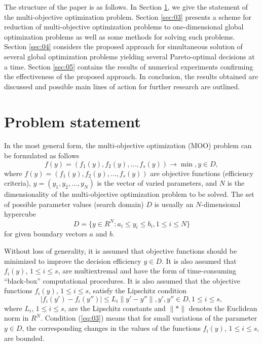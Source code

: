 \documentclass[runningheads]{llncs}
\begin{document}
The structure of the paper is as follows. In Section \ref{sec:02}, we give the statement of the multi-objective optimization problem. Section \ref{sec:03} presents a scheme for reduction of multi-objective optimization problems to one-dimensional global optimization problems as well as some methods for solving such problems. Section \ref{sec:04} considers the proposed approach for simultaneous solution of several global optimization problems yielding several Pareto-optimal decisions at a time. Section \ref{sec:05} contains the results of numerical experiments confirming the effectiveness of the proposed approach. In conclusion, the results obtained are discussed and possible main lines of action for further research are outlined.


\section{Problem statement} \label{sec:02}

In the most general form, the multi-objective optimization (MOO) problem can be formulated as follows
\begin{equation}
\label{eq:01}
f(y) = (f_1(y), f_2(y), \dots, f_s(y)) \to \min,  y\in D,
\end{equation}
where $f(y) = (f_1(y), f_2(y), \dots, f_s(y))$ are objective functions (efficiency criteria), $y = (y_1, y_2, \dots , y_N)$ is the vector of varied parameters, and $N$ is the dimensionality of the multi-objective optimization problem to be solved. The set of possible parameter values (search domain) $D$ is usually an $N$-dimensional hypercube
\begin{equation}
\label{eq:02}
D  = \{ y\in R^N: a_i \leq y_i \leq b_i, 1 \leq i \leq N \}
\end{equation}
for given boundary vectors $a$ and $b$.

Without loss of generality, it is assumed that objective functions should be minimized to improve the decision efficiency $y \in D$. It is also assumed that $f_i(y)$, $1 \leq i \leq s$, are multiextremal and have the form of time-consuming ``black-box'' computational procedures. It is also assumed that the objective functions $f_i(y)$, $1 \leq i \leq s$, satisfy the Lipschitz condition 
\begin{equation}
\label{eq:03}
|f_i(y') - f_i(y'')| \leq L_i\|y' - y''\|, y', y'' \in D, 1 \leq i \leq s,
\end{equation}
where $L_i$, $1 \leq i \leq s$, are the Lipschitz constants and $\|*\|$ denotes the Euclidean norm in $R^N$.  Condition (\ref{eq:03}) means that for small variations of the parameter $y \in D$, the corresponding changes in the values of the functions $f_i(y)$, $1 \leq i \leq s$, are bounded. 
\end{document}
